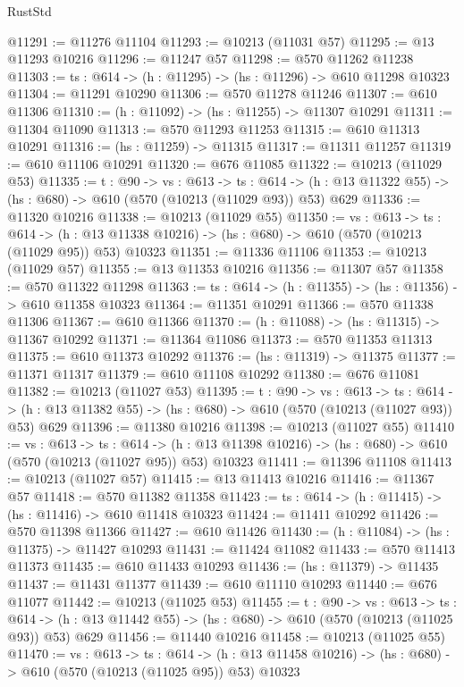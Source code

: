 \begin{lexlean}{RustStd}
\begin{coremodule}
@11291 := @11276 @11104
@11293 := @10213 (@11031 @57)
@11295 := @13 @11293 @10216
@11296 := @11247 @57
@11298 := @570 @11262 @11238
@11303 := {ts : @614} -> (h : @11295) -> (hs : @11296) -> @610 @11298 @10323
@11304 := @11291 @10290
@11306 := @570 @11278 @11246
@11307 := @610 @11306
@11310 := (h : @11092) -> (hs : @11255) -> @11307 @10291
@11311 := @11304 @11090
@11313 := @570 @11293 @11253
@11315 := @610 @11313 @10291
@11316 := (hs : @11259) -> @11315
@11317 := @11311 @11257
@11319 := @610 @11106 @10291
@11320 := @676 @11085
@11322 := @10213 (@11029 @53)
@11335 := {t : @90} ->
  {vs : @613} ->
  {ts : @614} -> (h : @13 @11322 @55) -> (hs : @680) -> @610 (@570 (@10213 (@11029 @93)) @53) @629
@11336 := @11320 @10216
@11338 := @10213 (@11029 @55)
@11350 := {vs : @613} ->
  {ts : @614} ->
  (h : @13 @11338 @10216) -> (hs : @680) -> @610 (@570 (@10213 (@11029 @95)) @53) @10323
@11351 := @11336 @11106
@11353 := @10213 (@11029 @57)
@11355 := @13 @11353 @10216
@11356 := @11307 @57
@11358 := @570 @11322 @11298
@11363 := {ts : @614} -> (h : @11355) -> (hs : @11356) -> @610 @11358 @10323
@11364 := @11351 @10291
@11366 := @570 @11338 @11306
@11367 := @610 @11366
@11370 := (h : @11088) -> (hs : @11315) -> @11367 @10292
@11371 := @11364 @11086
@11373 := @570 @11353 @11313
@11375 := @610 @11373 @10292
@11376 := (hs : @11319) -> @11375
@11377 := @11371 @11317
@11379 := @610 @11108 @10292
@11380 := @676 @11081
@11382 := @10213 (@11027 @53)
@11395 := {t : @90} ->
  {vs : @613} ->
  {ts : @614} -> (h : @13 @11382 @55) -> (hs : @680) -> @610 (@570 (@10213 (@11027 @93)) @53) @629
@11396 := @11380 @10216
@11398 := @10213 (@11027 @55)
@11410 := {vs : @613} ->
  {ts : @614} ->
  (h : @13 @11398 @10216) -> (hs : @680) -> @610 (@570 (@10213 (@11027 @95)) @53) @10323
@11411 := @11396 @11108
@11413 := @10213 (@11027 @57)
@11415 := @13 @11413 @10216
@11416 := @11367 @57
@11418 := @570 @11382 @11358
@11423 := {ts : @614} -> (h : @11415) -> (hs : @11416) -> @610 @11418 @10323
@11424 := @11411 @10292
@11426 := @570 @11398 @11366
@11427 := @610 @11426
@11430 := (h : @11084) -> (hs : @11375) -> @11427 @10293
@11431 := @11424 @11082
@11433 := @570 @11413 @11373
@11435 := @610 @11433 @10293
@11436 := (hs : @11379) -> @11435
@11437 := @11431 @11377
@11439 := @610 @11110 @10293
@11440 := @676 @11077
@11442 := @10213 (@11025 @53)
@11455 := {t : @90} ->
  {vs : @613} ->
  {ts : @614} -> (h : @13 @11442 @55) -> (hs : @680) -> @610 (@570 (@10213 (@11025 @93)) @53) @629
@11456 := @11440 @10216
@11458 := @10213 (@11025 @55)
@11470 := {vs : @613} ->
  {ts : @614} ->
  (h : @13 @11458 @10216) -> (hs : @680) -> @610 (@570 (@10213 (@11025 @95)) @53) @10323

\end{coremodule}
\end{lexlean}
